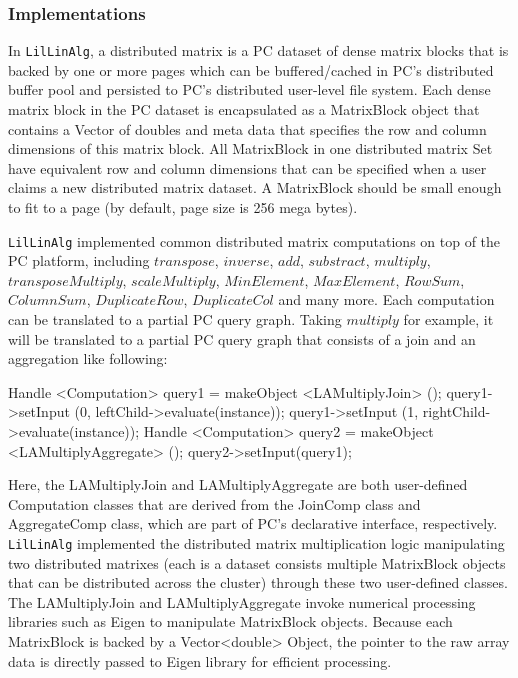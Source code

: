 \subsubsection {Implementations}
In \texttt{LilLinAlg}, a distributed matrix is a PC dataset of dense matrix
blocks that is backed by one or more pages which can be buffered/cached in PC's distributed buffer pool and
persisted to PC's distributed user-level file system. Each dense matrix
block in the PC dataset is encapsulated as a MatrixBlock object that contains a
Vector of doubles and meta data that specifies the row and column
dimensions of this matrix block. All MatrixBlock in one distributed
matrix Set have equivalent row and column dimensions that can be
specified when a user claims a new distributed matrix dataset. A
MatrixBlock should be small enough to fit to a page (by default, page size
is 256 mega bytes).

\texttt{LilLinAlg} implemented common distributed matrix
computations on top of the PC platform, including $transpose$,
$inverse$, $add$, $substract$, $multiply$, $transposeMultiply$, $scaleMultiply$, $MinElement$,
$MaxElement$, $RowSum$, $ColumnSum$, $DuplicateRow$, $DuplicateCol$
and many more. Each computation can be translated to a partial PC query
graph. Taking $multiply$ for example, it will be translated to a partial
PC query graph that consists of a join and an aggregation like following:

\begin{code}
Handle <Computation> query1 = makeObject <LAMultiplyJoin> ();
query1->setInput (0, leftChild->evaluate(instance));
query1->setInput (1, rightChild->evaluate(instance));
Handle <Computation> query2 = makeObject <LAMultiplyAggregate> ();
query2->setInput(query1);
\end{code}

Here, the LAMultiplyJoin and LAMultiplyAggregate are both user-defined Computation classes that are
derived from the JoinComp class and AggregateComp class, which are
part of PC's declarative interface,  respectively. \texttt{LilLinAlg}
implemented the distributed matrix multiplication logic manipulating
two distributed matrixes (each is a dataset consists multiple
MatrixBlock objects that can be distributed across the cluster) through these
two user-defined classes. The LAMultiplyJoin
and LAMultiplyAggregate invoke numerical processing libraries such as
Eigen to manipulate MatrixBlock objects. Because each
MatrixBlock is backed by a Vector<double> Object, the pointer to the
raw array data is directly passed to Eigen library for efficient processing.

